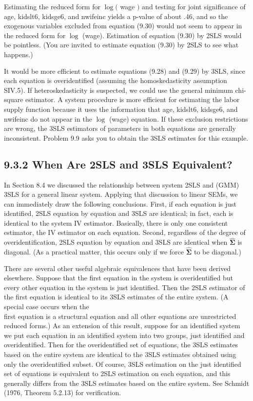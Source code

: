 \documentclass[10pt]{article}
\begin{document}
Estimating the reduced form for $\log ($ wage $)$ and testing for joint significance of age, kidslt6, kidsge6, and nwifeinc yields a p-value of about .46, and so the exogenous variables excluded from equation (9.30) would not seem to appear in the reduced form for $\log$ (wage). Estimation of equation (9.30) by 2SLS would be pointless. (You are invited to estimate equation (9.30) by 2SLS to see what happens.)

It would be more efficient to estimate equations (9.28) and (9.29) by 3SLS, since each equation is overidentified (assuming the homoskedasticity assumption SIV.5). If heteroskedasticity is suspected, we could use the general minimum chi-square estimator. A system procedure is more efficient for estimating the labor supply function because it uses the information that age, kidslt6, kidsge6, and nwifeinc do not appear in the $\log$ (wage) equation. If these exclusion restrictions are wrong, the 3SLS estimators of parameters in both equations are generally inconsistent. Problem 9.9 asks you to obtain the 3SLS estimates for this example.

\subsection*{9.3.2 When Are 2SLS and 3SLS Equivalent?}
In Section 8.4 we discussed the relationship between system 2SLS and (GMM) 3SLS for a general linear system. Applying that discussion to linear SEMs, we can immediately draw the following conclusions. First, if each equation is just identified, 2SLS equation by equation and 3SLS are identical; in fact, each is identical to the system IV estimator. Basically, there is only one consistent estimator, the IV estimator on each equation. Second, regardless of the degree of overidentification, 2SLS equation by equation and 3SLS are identical when $\hat{\boldsymbol{\Sigma}}$ is diagonal. (As a practical matter, this occurs only if we force $\hat{\boldsymbol{\Sigma}}$ to be diagonal.)

There are several other useful algebraic equivalences that have been derived elsewhere. Suppose that the first equation in the system is overidentified but every other equation in the system is just identified. Then the 2SLS estimator of the first equation is identical to its 3SLS estimates of the entire system. (A special case occurs when the\\
first equation is a structural equation and all other equations are unrestricted reduced forms.) As an extension of this result, suppose for an identified system we put each equation in an identified system into two groups, just identified and overidentified. Then for the overidentified set of equations, the 3SLS estimates based on the entire system are identical to the 3SLS estimates obtained using only the overidentified subset. Of course, 3SLS estimation on the just identified set of equations is equivalent to 2SLS estimation on each equation, and this generally differs from the 3SLS estimates based on the entire system. See Schmidt (1976, Theorem 5.2.13) for verification.
\end{document}
